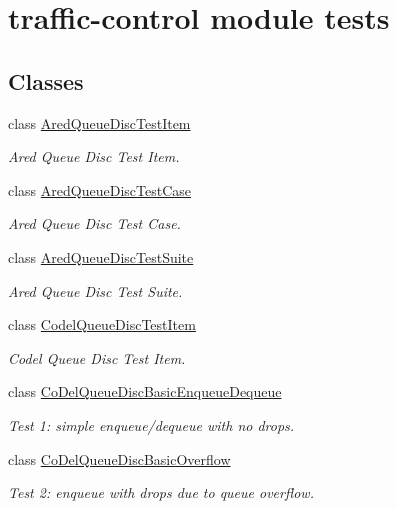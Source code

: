 \hypertarget{group__traffic-control-test}{}\section{traffic-\/control module tests}
\label{group__traffic-control-test}
\subsection*{Classes}
\begin{DoxyCompactItemize}
\item 
class \hyperlink{classAredQueueDiscTestItem}{Ared\+Queue\+Disc\+Test\+Item}
\begin{DoxyCompactList}\small\item\em Ared Queue Disc Test Item. \end{DoxyCompactList}\item 
class \hyperlink{classAredQueueDiscTestCase}{Ared\+Queue\+Disc\+Test\+Case}
\begin{DoxyCompactList}\small\item\em Ared Queue Disc Test Case. \end{DoxyCompactList}\item 
class \hyperlink{classAredQueueDiscTestSuite}{Ared\+Queue\+Disc\+Test\+Suite}
\begin{DoxyCompactList}\small\item\em Ared Queue Disc Test Suite. \end{DoxyCompactList}\item 
class \hyperlink{classCodelQueueDiscTestItem}{Codel\+Queue\+Disc\+Test\+Item}
\begin{DoxyCompactList}\small\item\em Codel Queue Disc Test Item. \end{DoxyCompactList}\item 
class \hyperlink{classCoDelQueueDiscBasicEnqueueDequeue}{Co\+Del\+Queue\+Disc\+Basic\+Enqueue\+Dequeue}
\begin{DoxyCompactList}\small\item\em Test 1\+: simple enqueue/dequeue with no drops. \end{DoxyCompactList}\item 
class \hyperlink{classCoDelQueueDiscBasicOverflow}{Co\+Del\+Queue\+Disc\+Basic\+Overflow}
\begin{DoxyCompactList}\small\item\em Test 2\+: enqueue with drops due to queue overflow. \end{DoxyCompactList}\item 

\end{DoxyCompactItemize}
